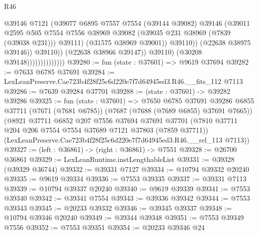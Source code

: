 \begin{lexlean}{R46}
\begin{coremodule}
                                            @39146
                                            @7121
                                            (@39077
                                              @6895
                                              @7557
                                              @7554
                                              (@39144 @39082)
                                              @39146
                                              (@39011
                                                @2595
                                                @505
                                                @7554
                                                @7556
                                                @38969
                                                @39082
                                                (@39035 @231 @38969 (@7839 (@39038 @231)))
                                                @39111)
                                              (@31575 @38969 @39001))
                                            @39110))
                                        (@22638 @38975 @39146))
                                      @39110))
                                  (@22638 @38966 @39147))
                                @39110)
                              (@30208 @39148))))))))))))))
@39280 := fun (state : @37601) => @9619 @37694
@39282 := @7633 @6785 @37691
@39284 := LexLeanPreserve.Cae723b4f28f25c6d220e7f7d64945ed3.R46.__fits_112 @7113
@39286 := @7639 @39284 @37701
@39288 := (state : @37601) -> @39282 @39286
@39325 := fun (state : @37601) =>
  @7650
    @6785
    @37691
    @39286
    @6855
    @37711
    (@7671 (@7681 @6785))
    (@7687 (@7688 (@7689 @6855) @37691 @7665))
    (@8921
      @37711
      @6852
      @207
      @7556
      @37694
      @37691
      @37701
      (@7810 @37711 @204 @206 @7554 @7554 @37689 @7121 @37803 (@7859 @37711))
      (LexLeanPreserve.Cae723b4f28f25c6d220e7f7d64945ed3.R46.__rel_113 @7113))
@39327 := (left : @36861) -> (right : @36861) -> @7551
@39328 := @26700 @36861
@39329 := LexLeanRuntime.instLengthableList
@39331 := @39328 (@39329 @36744)
@39332 := @39331 @7127
@39334 := @10794 @39332 @20240
@39335 := @9619 @39334
@39336 := @7553 @39335
@39337 := @39331 @7113
@39339 := @10794 @39337 @20240
@39340 := @9619 @39339
@39341 := @7553 @39340
@39342 := @39341 @7554
@39343 := @39336 @39342
@39344 := @7553 @39343
@39345 := @20233 @39332
@39346 := @39345 @39337
@39348 := @10794 @39346 @20240
@39349 := @39344 @39348
@39351 := @7553 @39349 @7556
@39352 := @7553 @39351
@39354 := @20233 @39346 @24

\end{coremodule}
\end{lexlean}
